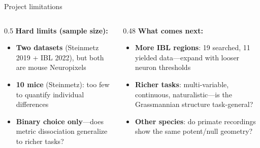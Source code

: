 \documentclass[aspectratio=169,11pt]{beamer}
\begin{document}
\begin{frame}{Project limitations}
\begin{columns}[T]
\begin{column}{0.5\textwidth}
\textbf{Hard limits (sample size):}
\begin{itemize}
  \item \textbf{Two datasets} (Steinmetz 2019 + IBL 2022), but both are mouse Neuropixels
  \item \textbf{10 mice} (Steinmetz): too few to quantify individual differences
  \item \textbf{Binary choice only}---does metric dissociation generalize to richer tasks?
\end{itemize}
\end{column}
\begin{column}{0.48\textwidth}
\textbf{What comes next:}
\begin{itemize}
  \item \textbf{More IBL regions}: 19 searched, 11 yielded data---expand with looser neuron thresholds
  \item \textbf{Richer tasks}: multi-variable, continuous, naturalistic---is the Grassmannian structure task-general?
  \item \textbf{Other species}: do primate recordings show the same potent/null geometry?
\end{itemize}
\end{column}
\end{columns}
\end{frame}
\end{document}
